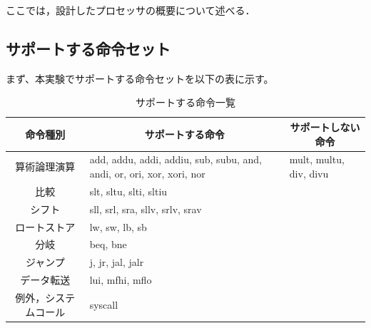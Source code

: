 \documentclass{jarticle}[11pt]
\begin{document}
ここでは，設計したプロセッサの概要について述べる．

\subsection{サポートする命令セット}

まず、本実験でサポートする命令セットを以下の表に示す。

\begin{table}[htb] %
\caption{サポートする命令一覧}
\label{サポートする命令一覧}
\begin{center}
\begin{tabular}{c|p{6cm}|p{4cm}}
\hline \hline
命令種別 & 
\multicolumn{1}{c}{サポートする命令} &
\multicolumn{1}{|c}{サポートしない命令} 
\\ \hline

算術論理演算 &
add, addu, addi, addiu, sub, subu, 
and, andi, or, ori, xor, xori, nor &
mult, multu, div, divu
\\

比較 &
slt, sltu, slti, sltiu &
\\

シフト &
sll, srl, sra, sllv, srlv, srav &
\\

ロートストア &
lw, sw, lb, sb &
\\

分岐 & 
beq, bne &
\\

ジャンプ &
j, jr, jal, jalr &
\\

データ転送 &
lui, mfhi, mflo &
\\

例外，システムコール &
syscall &
\\

\hline
\end{tabular}
\end{center}
\end{table}
\end{document}
